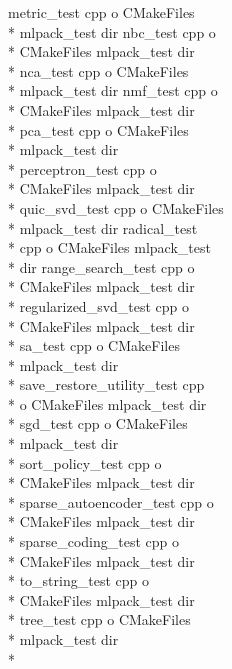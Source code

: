 \begin{DoxyCompactItemize}
metric\-\_\-test cpp o C\-Make\-Files \\*
mlpack\-\_\-test dir nbc\-\_\-test cpp o \\*
C\-Make\-Files mlpack\-\_\-test dir \\*
nca\-\_\-test cpp o C\-Make\-Files \\*
mlpack\-\_\-test dir nmf\-\_\-test cpp o \\*
C\-Make\-Files mlpack\-\_\-test dir \\*
pca\-\_\-test cpp o C\-Make\-Files \\*
mlpack\-\_\-test dir \\*
perceptron\-\_\-test cpp o \\*
C\-Make\-Files mlpack\-\_\-test dir \\*
quic\-\_\-svd\-\_\-test cpp o C\-Make\-Files \\*
mlpack\-\_\-test dir radical\-\_\-test \\*
cpp o C\-Make\-Files mlpack\-\_\-test \\*
dir range\-\_\-search\-\_\-test cpp o \\*
C\-Make\-Files mlpack\-\_\-test dir \\*
regularized\-\_\-svd\-\_\-test cpp o \\*
C\-Make\-Files mlpack\-\_\-test dir \\*
sa\-\_\-test cpp o C\-Make\-Files \\*
mlpack\-\_\-test dir \\*
save\-\_\-restore\-\_\-utility\-\_\-test cpp \\*
o C\-Make\-Files mlpack\-\_\-test dir \\*
sgd\-\_\-test cpp o C\-Make\-Files \\*
mlpack\-\_\-test dir \\*
sort\-\_\-policy\-\_\-test cpp o \\*
C\-Make\-Files mlpack\-\_\-test dir \\*
sparse\-\_\-autoencoder\-\_\-test cpp o \\*
C\-Make\-Files mlpack\-\_\-test dir \\*
sparse\-\_\-coding\-\_\-test cpp o \\*
C\-Make\-Files mlpack\-\_\-test dir \\*
to\-\_\-string\-\_\-test cpp o \\*
C\-Make\-Files mlpack\-\_\-test dir \\*
tree\-\_\-test cpp o C\-Make\-Files \\*
mlpack\-\_\-test dir \\*

\end{DoxyCompactItemize}
